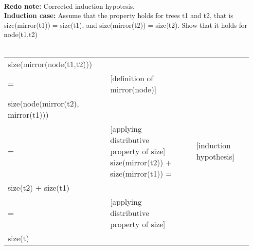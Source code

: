 \documentclass{article}
\begin{document}
\begin{enumerate}[\bf I.]
\begin{enumerate}
\\
\textbf{Redo note:} Corrected induction hypotesis. \\
\textbf{Induction case:} Assume that the property holds for trees t1 and t2, that is size(mirror(t1)) = size(t1), and size(mirror(t2)) = size(t2). Show that it holds for node(t1,t2) \\
\\
\begin{tabular}{l ll lll}
     size(mirror(node(t1,t2))) &    &  \\
     = &   & [definition of mirror(node)] \\
     size(node(mirror(t2), mirror(t1)))  & & \\
     = &   & [applying distributive property of size]
     size(mirror(t2)) + size(mirror(t1)) = &   & [induction hypothesis] \\
     size(t2) + size(t1) & & \\
     = &   & [applying distributive property of size] \\
     size(t) & & \\
\end{tabular} \\
\\


\end{enumerate}
\end{enumerate}
\end{document}
